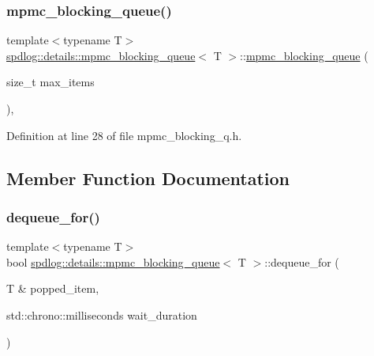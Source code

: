 \subsubsection{\texorpdfstring{mpmc\+\_\+blocking\+\_\+queue()}{mpmc\_blocking\_queue()}}
{\footnotesize\ttfamily template$<$typename T$>$ \\
\hyperlink{classspdlog_1_1details_1_1mpmc__blocking__queue}{spdlog\+::details\+::mpmc\+\_\+blocking\+\_\+queue}$<$ T $>$\+::\hyperlink{classspdlog_1_1details_1_1mpmc__blocking__queue}{mpmc\+\_\+blocking\+\_\+queue} (\begin{DoxyParamCaption}\item[{size\+\_\+t}]{max\+\_\+items }\end{DoxyParamCaption})\hspace{0.3cm}{\ttfamily [inline]}, {\ttfamily [explicit]}}



Definition at line 28 of file mpmc\+\_\+blocking\+\_\+q.\+h.



\subsection{Member Function Documentation}
\mbox{\label{classspdlog_1_1details_1_1mpmc__blocking__queue_af4015ea1657b393755f34d76c97a28d1}} 
\subsubsection{\texorpdfstring{dequeue\+\_\+for()}{dequeue\_for()}}
{\footnotesize\ttfamily template$<$typename T$>$ \\
bool \hyperlink{classspdlog_1_1details_1_1mpmc__blocking__queue}{spdlog\+::details\+::mpmc\+\_\+blocking\+\_\+queue}$<$ T $>$\+::dequeue\+\_\+for (\begin{DoxyParamCaption}\item[{T \&}]{popped\+\_\+item,  }\item[{std\+::chrono\+::milliseconds}]{wait\+\_\+duration }\end{DoxyParamCaption})\hspace{0.3cm}{\ttfamily [inline]}}



